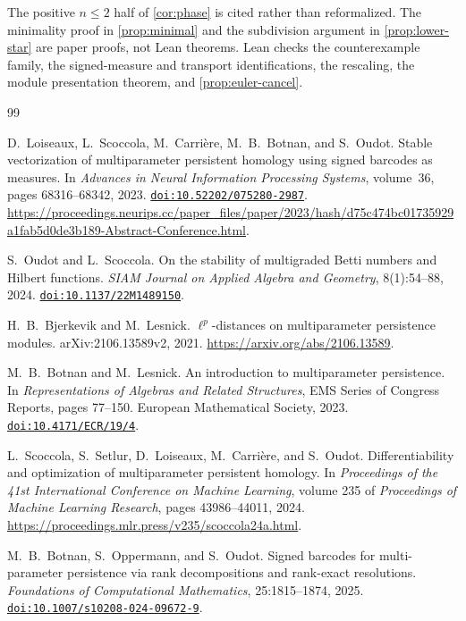 \documentclass[11pt]{article}
\theoremstyle{definition}
\newcommand{\1}{\mathbf{1}}
\newcommand{\doi}[1]{\href{https://doi.org/#1}{\nolinkurl{doi:#1}}}
\begin{document}
The positive $n\leq2$ half of \cref{cor:phase} is cited rather than
reformalized.  The minimality proof in \cref{prop:minimal} and the
subdivision argument in \cref{prop:lower-star} are paper proofs, not Lean
theorems.  Lean checks the counterexample family, the signed-measure and
transport identifications, the rescaling, the module presentation theorem,
and \cref{prop:euler-cancel}.

\begin{thebibliography}{99}
\raggedright
{}

D.~Loiseaux, L.~Scoccola, M.~Carrière, M.~B.~Botnan, and S.~Oudot.
\newblock Stable vectorization of multiparameter persistent homology using
signed barcodes as measures.
\newblock In \emph{Advances in Neural Information Processing Systems},
volume~36, pages 68316--68342, 2023.
\newblock \doi{10.52202/075280-2987}.
\newblock \url{https://proceedings.neurips.cc/paper_files/paper/2023/hash/d75c474bc01735929a1fab5d0de3b189-Abstract-Conference.html}.

S.~Oudot and L.~Scoccola.
\newblock On the stability of multigraded Betti numbers and Hilbert
functions.
\newblock \emph{SIAM Journal on Applied Algebra and Geometry},
8(1):54--88, 2024.
\newblock \doi{10.1137/22M1489150}.

H.~B.~Bjerkevik and M.~Lesnick.
\newblock $\ell^p$-distances on multiparameter persistence modules.
\newblock arXiv:2106.13589v2, 2021.
\newblock \url{https://arxiv.org/abs/2106.13589}.

M.~B.~Botnan and M.~Lesnick.
\newblock An introduction to multiparameter persistence.
\newblock In \emph{Representations of Algebras and Related Structures},
EMS Series of Congress Reports, pages 77--150. European Mathematical
Society, 2023.
\newblock \doi{10.4171/ECR/19/4}.

L.~Scoccola, S.~Setlur, D.~Loiseaux, M.~Carrière, and S.~Oudot.
\newblock Differentiability and optimization of multiparameter persistent
homology.
\newblock In \emph{Proceedings of the 41st International Conference on
Machine Learning}, volume 235 of \emph{Proceedings of Machine Learning
Research}, pages 43986--44011, 2024.
\newblock \url{https://proceedings.mlr.press/v235/scoccola24a.html}.

M.~B.~Botnan, S.~Oppermann, and S.~Oudot.
\newblock Signed barcodes for multi-parameter persistence via rank
decompositions and rank-exact resolutions.
\newblock \emph{Foundations of Computational Mathematics},
25:1815--1874, 2025.
\newblock \doi{10.1007/s10208-024-09672-9}.


\end{thebibliography}
\end{document}
